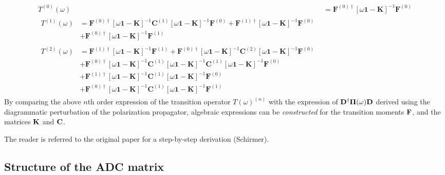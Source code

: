 \begin{align}
T^{(0)}(\omega) &= \mathbf{F}^{(0)\dagger} \left[ \omega \mathbf{1} - \mathbf{K} \right]^{-1} \mathbf{F}^{(0)} \\
\begin{split}
T^{(1)}(\omega) &= \mathbf{F}^{(0)\dagger} \left[ \omega \mathbf{1} - \mathbf{K} \right]^{-1} \mathbf{C}^{(1)} \left[ \omega \mathbf{1} - \mathbf{K} \right]^{-1} \mathbf{F}^{(0)} + \mathbf{F}^{(1)\dagger} \left[ \omega \mathbf{1} - \mathbf{K} \right]^{-1} \mathbf{F}^{(0)} \\
&+ \mathbf{F}^{(0)\dagger} \left[ \omega \mathbf{1} - \mathbf{K} \right]^{-1} \mathbf{F}^{(1)} 
\end{split} 
\\
\begin{split}
T^{(2)}(\omega) &= \mathbf{F}^{(1)\dagger} \left[ \omega \mathbf{1} - \mathbf{K} \right]^{-1} \mathbf{F}^{(1)} + \mathbf{F}^{(0)\dagger} \left[ \omega \mathbf{1} - \mathbf{K} \right]^{-1} \mathbf{C}^{(2)} \left[ \omega \mathbf{1} - \mathbf{K} \right]^{-1} \mathbf{F}^{(0)} \\
&+ \mathbf{F}^{(0)\dagger} \left[ \omega \mathbf{1} - \mathbf{K} \right]^{-1} \mathbf{C}^{(1)} \left[ \omega \mathbf{1} - \mathbf{K} \right]^{-1} \mathbf{C}^{(1)} \left[ \omega \mathbf{1} - \mathbf{K} \right]^{-1} \mathbf{F}^{(0)} \\
&+ \mathbf{F}^{(1)\dagger} \left[ \omega \mathbf{1} - \mathbf{K} \right]^{-1} \mathbf{C}^{(1)} \left[ \omega \mathbf{1} - \mathbf{K} \right]^{-1} \mathbf{F}^{(0)} \\
&+ \mathbf{F}^{(0)\dagger} \left[ \omega \mathbf{1} - \mathbf{K} \right]^{-1} \mathbf{C}^{(1)} \left[ \omega \mathbf{1} - \mathbf{K} \right]^{-1} \mathbf{F}^{(1)}
\end{split}
\end{align}
\noindent By comparing the above $n$th order expression of the transition operator $T(\omega)^{(n)}$ with the expression of $\mathbf{D}^{\dagger} \mathbf{\Pi}(\omega) \mathbf{D}$ derived using the diagrammatic perturbation of the polarization propagator, algebraic expressions can be \emph{constructed} for the transition moments $\mathbf{F}$, and the matrices $\mathbf{K}$ and $\mathbf{C}$. 

The reader is referred to the original paper for a step-by-step derivation (Schirmer). 

\subsection{Structure of the ADC matrix}

